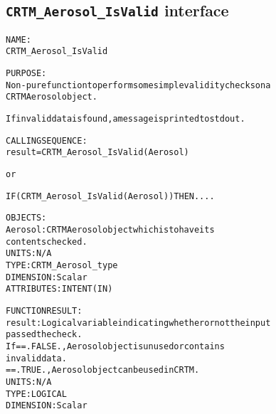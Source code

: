 \subsection{\texttt{CRTM\_Aerosol\_IsValid} interface}
  \label{sec:CRTM_Aerosol_IsValid_interface}
  \begin{alltt}
 
  NAME:
        CRTM_Aerosol_IsValid
 
  PURPOSE:
        Non-pure function to perform some simple validity checks on a
        CRTM Aerosol object.
 
        If invalid data is found, a message is printed to stdout.
 
  CALLING SEQUENCE:
        result = CRTM_Aerosol_IsValid( Aerosol )
 
          or
 
        IF ( CRTM_Aerosol_IsValid( Aerosol ) ) THEN....
 
  OBJECTS:
        Aerosol:       CRTM Aerosol object which is to have its
                       contents checked.
                       UNITS:      N/A
                       TYPE:       CRTM_Aerosol_type
                       DIMENSION:  Scalar
                       ATTRIBUTES: INTENT(IN)
 
  FUNCTION RESULT:
        result:        Logical variable indicating whether or not the input
                       passed the check.
                       If == .FALSE., Aerosol object is unused or contains
                                      invalid data.
                          == .TRUE.,  Aerosol object can be used in CRTM.
                       UNITS:      N/A
                       TYPE:       LOGICAL
                       DIMENSION:  Scalar
 
  \end{alltt}
